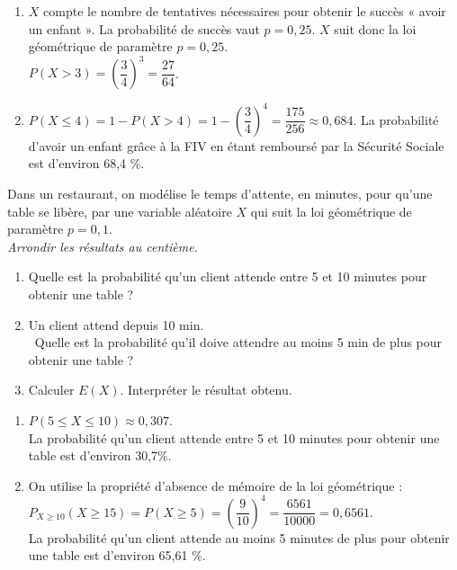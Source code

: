 \documentclass[a4paper,11pt,exos]{nsi} %
\begin{document}
\begin{enumerate}
    \item $X$ compte le nombre de tentatives nécessaires pour obtenir le succès « avoir un enfant ». La probabilité de succès vaut $p=0,25$. $X$ suit donc la loi géométrique de paramètre $p=0,25$.\\
    $P(X>3)=\left(\dfrac{3}{4}\right)^3=\dfrac{27}{64}$.
    
    \item $P(X\leqslant4)=1-P(X>4)=1-\left(\dfrac{3}{4}\right)^4=\dfrac{175}{256}\approx0,684$.
    La probabilité d'avoir un enfant grâce à la FIV en étant remboursé par la Sécurité Sociale est d'environ 68,4 \%.
\end{enumerate}

\exo{}%
\textcolor{UGLiBlue}{Dans un restaurant, on modélise le temps d'attente, en minutes, pour qu'une table se libère, par une variable aléatoire $X$ qui suit la loi géométrique de paramètre $p=0,1$.\\
\textit{Arrondir les résultats au centième.}
\begin{enumerate}
    \item Quelle est la probabilité qu'un client attende entre 5 et 10 minutes pour obtenir une table ?
    \item Un client attend depuis 10 min.\\\
    Quelle est la probabilité qu'il doive attendre au moins 5 min de plus pour obtenir une table ?
    \item Calculer $E(X)$. Interpréter le résultat obtenu.
\end{enumerate}}

\begin{enumerate}
    \item $P(5\leqslant X\leqslant10)\approx 0,307$.\\
    La probabilité qu'un client attende entre 5 et 10 minutes pour obtenir une table est d'environ 30,7\%.
    \item On utilise la propriété d'absence de mémoire de la loi géométrique : \\
    $P_{X\geqslant 10}(X\geqslant 15)=P(X\geqslant 5)=\left(\dfrac{9}{10}\right)^4=\dfrac{6561}{10000}=0,6561$.\\
    La probabilité qu'un client attende au moins 5 minutes de plus pour obtenir une table est d'environ 65,61 \%.
\end{enumerate}
\end{document}
